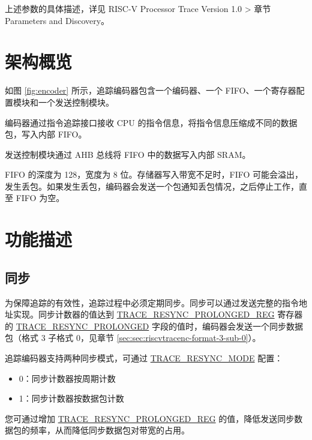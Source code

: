 \documentclass[main\_\_CN.tex]{subfiles}
\begin{document}
上述参数的具体描述，详见 RISC-V Processor Trace Version 1.0 > 章节 Parameters and Discovery。


\section{架构概览}
\label{sec:riscvtracenc-arch-overview}


如图 \ref{fig:encoder} 所示，追踪编码器包含一个编码器、一个 FIFO、一个寄存器配置模块和一个发送控制模块。

编码器通过指令追踪接口接收 CPU 的指令信息，将指令信息压缩成不同的数据包，写入内部 FIFO。

发送控制模块通过 AHB 总线将 FIFO 中的数据写入内部 SRAM。

FIFO 的深度为 128，宽度为 8 位。存储器写入带宽不足时，FIFO 可能会溢出，发生丢包。如果发生丢包，编码器会发送一个包通知丢包情况，之后停止工作，直至 FIFO 为空。



\section{功能描述}
\label{sec:riscvtracenc-func-desc}

\subsection{同步}

为保障追踪的有效性，追踪过程中必须定期同步。同步可以通过发送完整的指令地址实现。同步计数器的值达到 \hyperref[regdesc:TRACERESYNCPROLONGEDREG] {TRACE\_RESYNC\_PROLONGED\_REG} 寄存器的 \hyperref[fielddesc:TRACERESYNCPROLONGED]{TRACE\_RESYNC\_PROLONGED} 字段的值时，编码器会发送一个同步数据包（格式 3 子格式 0，见章节 \ref{sec:sec:riscvtracenc-format-3-sub-0}）。

追踪编码器支持两种同步模式，可通过 \hyperref[fielddesc:TRACERESYNCMODE]{TRACE\_RESYNC\_MODE} 配置：
\begin{itemize}
    \item 0：同步计数器按周期计数
    \item 1：同步计数器按数据包计数
\end{itemize}

您可通过增加 \hyperref[regdesc:TRACERESYNCPROLONGEDREG]{TRACE\_RESYNC\_PROLONGED\_REG} 的值，降低发送同步数据包的频率，从而降低同步数据包对带宽的占用。
\end{document}
